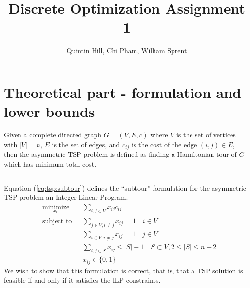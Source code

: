 \documentclass[11pt,a4paper,english]{article}
\begin{document}
\title{Discrete Optimization Assignment 1}
\author{Quintin Hill, Chi Pham, William Sprent}
\maketitle
\tableofcontents
\clearpage

\section{Theoretical part - formulation and lower bounds}
Given a complete directed graph $G = (V, E, c)$ where $V$ is the set of vertices with
$|V| = n$, $E$ is the set of edges, and $c_{ij}$ is the cost
of the edge $(i,j) \in E$, then the asymmetric TSP problem is defined as finding a
 Hamiltonian tour of $G$ which has minimum total cost.
 \subsection{}
 Equation (\ref{eq:tsp:subtour}) defines the  ``subtour''  formulation
  for the asymmetric TSP problem  an Integer
  Linear Program.
 \begin{equation}
   \label{eq:tsp:subtour}
   \begin{aligned}
     & \underset{x_{ij}}{\text{minimize}}
     & & \sum_{i,j \in V} x_{ij}c_{ij} \\
     & \text{subject to}
     & & \sum_{j \in V, i \neq j} x_{ij} = 1 \quad i \in V \\
     & & & \sum_{i \in V, i \neq j} x_{ij} = 1 \quad j \in V \\
     & & & \sum_{i,j \in S} x_{ij} \leq |S| - 1 \quad S \subset V, 2 \leq |S| \leq n-2 \\
     & & & x_{ij} \in \{0,1\}
   \end{aligned}
 \end{equation}
 We wish to show that this formulation is correct, that is, that a TSP solution is feasible if and only if it satisfies the ILP constraints.
\end{document}
